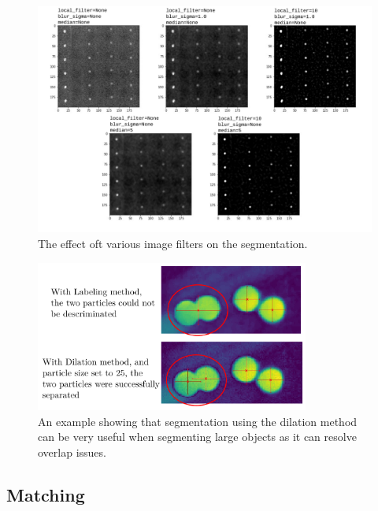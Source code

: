 \documentclass[10pt,a4paper]{article}
\begin{document}
\begin{figure}[h!]
	\centering
	\includegraphics[width=12cm]{filters_effect.pdf}
	\caption{The effect oft various image filters on the segmentation.\label{fig:image_filters}}
\end{figure}



\begin{figure}[h!]
	\centering
	\includegraphics[width=9cm]{Labeling_vs_Dilation.pdf}
	\caption{An example showing that segmentation using the dilation method can be very useful when segmenting large objects as it can resolve overlap issues.\label{fig:Labeling_vs_Dilation}}
\end{figure}


















\subsection{Matching}\label{sec:workflow_match}
\end{document}
